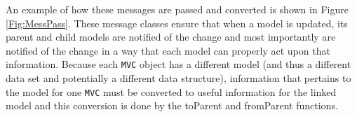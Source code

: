 \documentclass[11pt]{article}
\newcommand{\Rfunction}[1]{{\textsf{#1}}}
\newcommand{\Robject}[1]{{\texttt{#1}}}
\begin{document}

An example of how these messages are passed and converted is shown in
Figure \ref{Fig:MessPass}.  These message classes ensure that when a
model is updated, its parent and child models are notified of the
change and most importantly are notified of the change in a way that
each model can properly act upon that information.  Because each
\Robject{MVC} object has a different model (and thus a different data
set and potentially a different data structure), information that
pertains to the model for one \Robject{MVC} must be converted to
useful information for the linked model and this conversion is done by
the \Rfunction{toParent} and \Rfunction{fromParent} functions.
\end{document}
